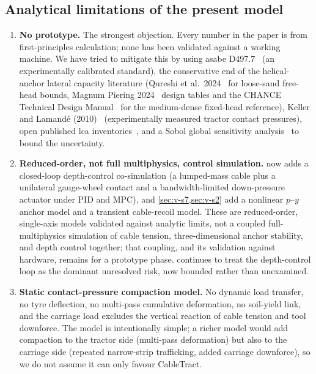 \documentclass[11pt,a4paper]{article}
\begin{document}
\subsection{Analytical limitations of the present model}\label{sec:analytical-limitations}

\begin{enumerate}[leftmargin=1.8em,itemsep=0.2em]
    \item \textbf{No prototype.} The strongest objection. Every number in the paper is from first-principles calculation; none has been validated against a working machine. We have tried to mitigate this by using \gls{asabe} D497.7~\cite{asabe-d497} (an experimentally calibrated standard), the conservative end of the helical-anchor lateral capacity literature (Qureshi et al.\ 2024~\cite{khand2024helical} for loose-sand free-head bounds, Magnum Piering 2024~\cite{magnum2024fixed} design tables and the CHANCE Technical Design Manual~\cite{chance2024manual} for the medium-dense fixed-head reference), Keller and Lamand\'e (2010)~\cite{keller2010compaction} (experimentally measured tractor contact pressures), open published \gls{lca} inventories~\cite{hammond2019ice,emilsson2019battery,fraunhoferise2022pv,hawkins2013ev,defra2023factors,eea2023electricity}, and a Sobol global sensitivity analysis~\cite{sobol2001indices,saltelli2008primer,herman2017salib} to bound the uncertainty.
    \item \textbf{Reduced-order, not full multiphysics, control simulation.}  now adds a closed-loop depth-control co-simulation (a lumped-mass cable plus a unilateral gauge-wheel contact and a bandwidth-limited down-pressure actuator under PID and MPC), and \cref{sec:v-s7,sec:v-s2} add a nonlinear $p$--$y$ anchor model and a transient cable-recoil model. These are reduced-order, single-axis models validated against analytic limits, not a coupled full-multiphysics simulation of cable tension, three-dimensional anchor stability, and depth control together; that coupling, and its validation against hardware, remains for a prototype phase.  continues to treat the depth-control loop as the dominant unresolved risk, now bounded rather than unexamined.
    \item \textbf{Static contact-pressure compaction model.} No dynamic load transfer, no tyre deflection, no multi-pass cumulative deformation, no soil-yield link, and the carriage load excludes the vertical reaction of cable tension and tool downforce. The model is intentionally simple; a richer model would add compaction to the tractor side (multi-pass deformation) but also to the carriage side (repeated narrow-strip trafficking, added carriage downforce), so we do not assume it can only favour CableTract.

\end{enumerate}
\end{document}

